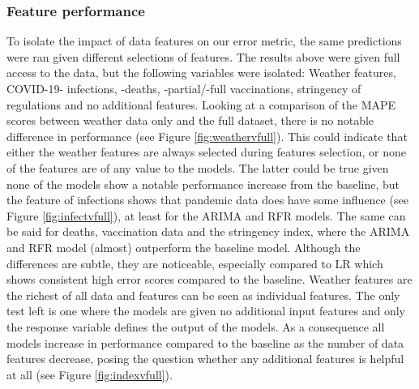 \subsubsection{Feature performance}
To isolate the impact of data features on our error metric, the same predictions were ran given different selections of features. The results above were given full access to the data, but the following variables were isolated: Weather features, COVID-19- infections, -deaths, -partial/-full vaccinations, stringency of regulations \cite{hale2020variation} and no additional features.
Looking at a comparison of the MAPE scores between weather data only and the full dataset, there is no notable difference in performance (see Figure \ref{fig:weathervfull}). This could indicate that either the weather features are always selected during features selection, or none of the features are of any value to the models.
The latter could be true given none of the models show a notable performance increase from the baseline, but the feature of infections shows that pandemic data does have some influence (see Figure \ref{fig:infectvfull}), at least for the ARIMA and RFR models. The same can be said for deaths, vaccination data and the stringency index, where the ARIMA and RFR model (almost) outperform the baseline model. Although the differences are subtle, they are noticeable, especially compared to LR which shows consistent high error scores compared to the baseline. 
Weather features are the richest of all data and features can be seen as individual features. The only test left is one where the models are given no additional input features and only the response variable defines the output of the models. As a consequence all models increase in performance compared to the baseline as the number of data features decrease, posing the question whether any additional features is helpful at all (see Figure \ref{fig:indexvfull}). 

